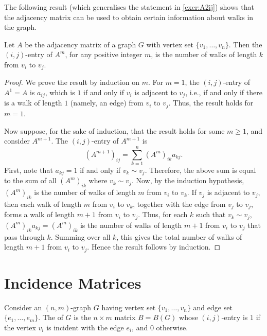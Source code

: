 The following result (which generalises the statement in \cref{exer:A2ij}) shows that the adjacency matrix can be used to obtain certain information about walks in the graph.

\begin{Theorem}
Let $A$ be the adjacency matrix of a graph $G$ with vertex set $\{v_1, \ldots, v_n\}$. Then the $(i,j)$-entry of $A^m$, for any positive integer $m$, is the number of walks of length $k$ from $v_i$ to $v_j$.
\end{Theorem}

\begin{proof}
We prove the result by induction on $m$. For $m = 1$, the $(i,j)$-entry of $A^1 = A$ is $a_{ij}$, which is $1$ if and only if $v_i$ is adjacent to $v_j$, i.e., if and only if there is a walk of length $1$ (namely, an edge) from $v_i$ to $v_j$. Thus, the result holds for $m = 1$.

Now suppose, for the sake of induction, that the result holds for some $m \ge 1$, and consider $A^{m + 1}$. The $(i,j)$-entry of $A^{m + 1}$ is
\begin{equation*}
(A^{m + 1})_{ij} = \sum_{k = 1}^{n} (A^m)_{ik} a_{kj}.
\end{equation*}
First, note that $a_{kj} = 1$ if and only if $v_k \sim v_j$. Therefore, the above sum is equal to the sum of all $(A^m)_{ik}$ where $v_k \sim v_j$. Now, by the induction hypothesis, $(A^m)_{ik}$ is the number of walks of length $m$ from $v_i$ to $v_k$. If $v_j$ is adjacent to $v_j$, then each walk of length $m$ from $v_i$ to $v_k$, together with the edge from $v_j$ to $v_j$, forms a walk of length $m + 1$ from $v_i$ to $v_j$. Thus, for each $k$ such that $v_k \sim v_j$, $(A^m)_{ik} a_{kj} = (A^m)_{ik}$ is the number of walks of length $m + 1$ from $v_i$ to $v_j$ that pass through $k$. Summing over all $k$, this gives the total number of walks of length $m + 1$ from $v_i$ to $v_j$. Hence the result follows by induction.
\end{proof}

\section{Incidence Matrices}\label{sec:IncMat}

Consider an $(n, m)$-graph $G$ having vertex set $\{v_1, \ldots, v_n\}$ and edge set $\{e_1, \ldots, e_m\}$. The  of $G$ is the $n \times m$ matrix $B = B(G)$ whose $(i, j)$-entry is $1$ if the vertex $v_i$ is incident with the edge $e_i$, and $0$ otherwise.

